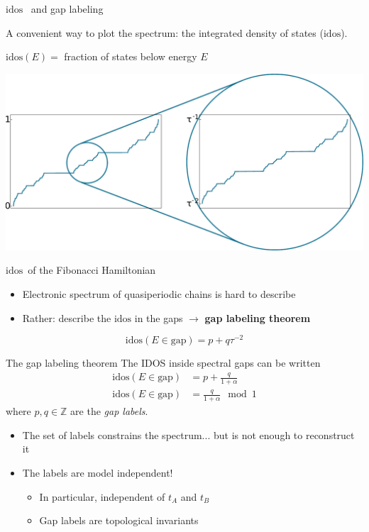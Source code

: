 \documentclass[xcolor=x11names,compress,professionalfonts]{beamer}
\renewcommand{\(}{\begin{columns}}
\renewcommand{\)}{\end{columns}}
\newcommand{\<}[1]{\begin{column}{#1}}
\renewcommand{\>}{\end{column}}
\newcommand{\id}{\ensuremath{\text{idos}}}
\begin{document}
\begin{frame}{\id~ and gap labeling}

A convenient way to plot the spectrum: the integrated density of states ($\id$).

$\id(E) = $ fraction of states below energy $E$

{\centering
\includegraphics[scale=.35]{img/idos_scaling.pdf}

\small{\id~of the Fibonacci Hamiltonian}

}

\begin{itemize}
	\item Electronic spectrum of quasiperiodic chains is hard to describe
	\item Rather: describe the $\id$ in the gaps $\to$ \textbf{gap labeling theorem}
\end{itemize}
\[
	\id(E\in \text{gap}) = p+ q \tau^{-2} 
\]

\end{frame}

\begin{frame}{The gap labeling theorem}
The IDOS inside spectral gaps can be written
	\begin{align*}
		\id(E \in \text{gap}) &= p+\frac{q}{1+\alpha} \\
		\id(E \in \text{gap}) &=  \frac{q}{1+\alpha} \mod 1
	\end{align*}
	where $p, q \in \mathbb{Z}$ are the \emph{gap labels}.
\begin{itemize}
	\item The set of labels constrains the spectrum... but is not enough to reconstruct it
	\item The labels are model independent! 
	\begin{itemize}
		\item In particular, independent of $t_A$ and $t_B$
		\item Gap labels are topological invariants
	\end{itemize}
\end{itemize}


\end{frame}
\end{document}
